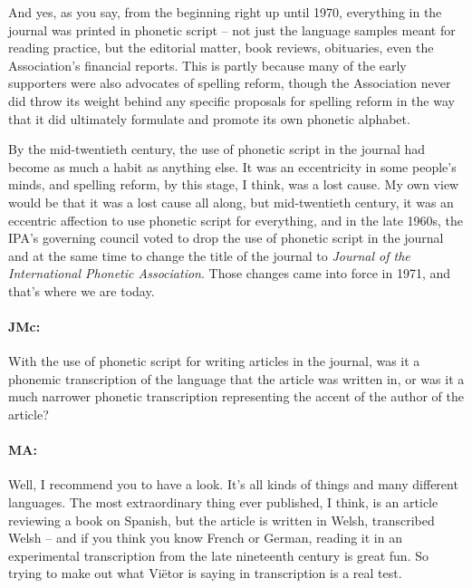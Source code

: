 \documentclass[output=paper]{langscibook}
\begin{document}
And yes, as you say, from the beginning right up until 1970, everything in the journal was printed in phonetic script – not just the language samples meant for reading practice, but the editorial matter, book reviews, obituaries, even the Association’s financial reports. This is partly because many of the early supporters were also advocates of spelling reform, though the Association never did throw its weight behind any specific proposals for spelling reform in the way that it did ultimately formulate and promote its own phonetic alphabet. 

By the mid-twentieth century, the use of phonetic script in the journal had become as much a habit as anything else. It was an eccentricity in some people’s minds, and spelling reform, by this stage, I think, was a lost cause. My own view would be that it was a lost cause all along, but mid-twentieth century, it was an eccentric affection to use phonetic script for everything, and in the late 1960s, the IPA’s governing council voted to drop the use of phonetic script in the journal and at the same time to change the title of the journal to \textit{Journal of the International Phonetic Association}. Those changes came into force in 1971, and that’s where we are today.

\paragraph*{JMc:} With the use of phonetic script for writing articles in the journal, was it a phonemic transcription of the language that the article was written in, or was it a much narrower phonetic transcription representing the accent of the author of the article?

\paragraph*{MA:} Well, I recommend you to have a look. It’s all kinds of things and many different languages. The most extraordinary thing ever published, I think, is an article reviewing a book on Spanish, but the article is written in Welsh, transcribed Welsh – and if you think you know French or German, reading it in an experimental transcription from the late nineteenth century is great fun. So trying to make out what Viëtor is saying in transcription is a real test.
\end{document}
